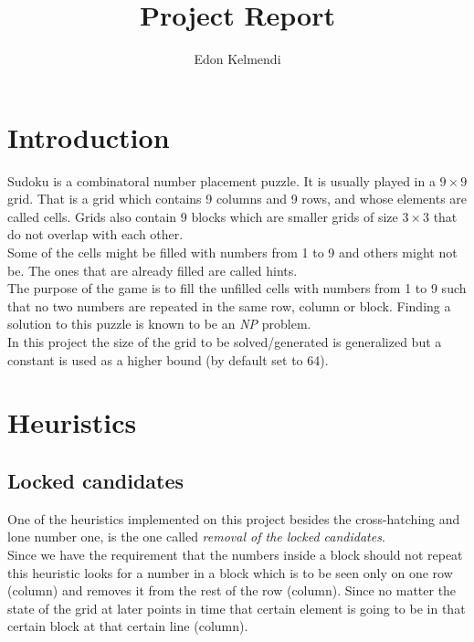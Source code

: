 \documentclass[english,a4paper]{article}
\begin{document}
\title{Project Report}
\author{Edon Kelmendi}
\maketitle
\newpage
\section{Introduction}

Sudoku is a combinatoral number placement puzzle. It is usually played
in a $9\times 9$ grid. That is a grid which contains 9 columns and 9 rows,
and whose elements are called cells. Grids also contain 9 blocks which
are smaller grids of size $3\times 3$ that do not overlap with each other.\\

Some of the cells might be filled with numbers from 1 to 9 and others
might not be. The ones that are already filled are called hints.\\

The purpose of the game is to fill the unfilled cells with numbers
from 1 to 9 such that no two numbers are repeated in the same row,
column or block. Finding a solution to this puzzle is known to be an
\emph{NP} problem.\\ 

In this project the size of the grid to be solved/generated is
generalized but a constant is used as a higher bound (by default set
to 64).\\

\section{Heuristics}

\subsection{Locked candidates}

One of the heuristics implemented on this project besides the
cross-hatching and lone number one, is the one called \emph{removal of
  the locked candidates}.\\

Since we have the requirement that the numbers inside a block should
not repeat this heuristic looks for a number in a block which is to be
seen only on one row (column) and removes it from the rest of the row
(column). Since no matter the state of the grid at later points in
time that certain element is going to be in that certain block at that
certain line (column).\\
\end{document}
